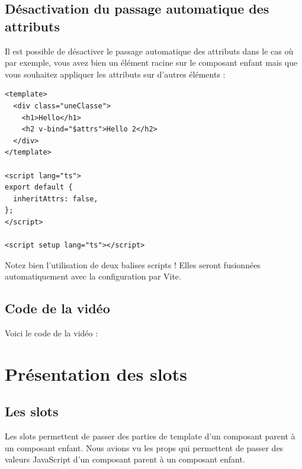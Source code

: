 \documentclass{article}
\begin{document}
\subsection{Désactivation du passage automatique des attributs}
Il est possible de désactiver le passage automatique des attributs dans le cas où par exemple, vous avez bien un élément racine sur le composant enfant mais que vous souhaitez appliquer les attributs sur d'autres éléments :
\begin{verbatim}
<template>
  <div class="uneClasse">
    <h1>Hello</h1>
    <h2 v-bind="$attrs">Hello 2</h2>
  </div>
</template>

<script lang="ts">
export default {
  inheritAttrs: false,
};
</script>

<script setup lang="ts"></script>
\end{verbatim}
Notez bien l'utilisation de deux balises {\color{monOrange}scripts} ! Elles seront fusionnées automatiquement avec la configuration par {\color{monOrange}Vite}.

\subsection{Code de la vidéo}
Voici le code de la vidéo :


\section{Présentation des slots}
\subsection{Les {\color{monOrange}slots}}
Les {\color{monOrange}slots} permettent de passer des parties de {\color{monOrange}template} d'un composant parent à un composant enfant. Nous avions vu les {\color{monOrange}props} qui permettent de passer des valeurs JavaScript d'un composant parent à un composant enfant.
\end{document}
